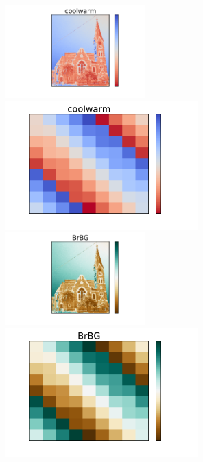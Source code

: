 \documentclass{beamer}
\begin{document}
\begin{frame}
\begin{columns}
\begin{column}{0.5\textwidth}
\begin{center}
\end{center}
\end{column}
\begin{column}{0.5\textwidth}
\begin{center}
\vfill
\includegraphics[width=0.42\textwidth]{../church_coolwarm.pdf}
\includegraphics[width=0.58\textwidth]{../magicsquare_coolwarm.pdf}\newline\newline
\vfill
\includegraphics[width=0.42\textwidth]{../church_BrBG.pdf}
\includegraphics[width=0.58\textwidth]{../magicsquare_BrBG.pdf}
\vfill
\end{center}
\end{column}
\end{columns}
\end{frame}
\end{document}

